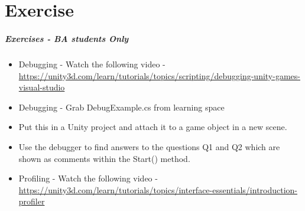 \part{Exercise}
\frame{\partpage}

\begin{frame}
\frametitle{Exercises - BA students Only}
\begin{itemize}
	\item Debugging - Watch the following video - \url{https://unity3d.com/learn/tutorials/topics/scripting/debugging-unity-games-visual-studio}
	\item Debugging - Grab DebugExample.cs from learning space
	\item Put this in a Unity project and attach it to a game object in a new scene.
	\item Use the debugger to find answers to the questions Q1 and Q2 which are shown as comments within the Start() method.
	\item Profiling - Watch the following video - \url{https://unity3d.com/learn/tutorials/topics/interface-essentials/introduction-profiler}
\end{itemize}
\end{frame}